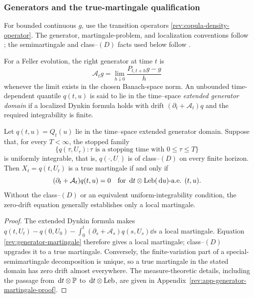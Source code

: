 \subsubsection{Generators and the true-martingale qualification}

For bounded continuous $g$, use the transition operators
\eqref{rev:copula-density-operator}.  The generator, martingale-problem, and
localization conventions follow \citet[Chapter~4]{EthierKurtz1986}; the
semimartingale and class--$(D)$ facts used below follow
\citet[Chapters~I--III]{Protter2005}.

\begin{definition}
\label{rev:def-generator}
For a Feller evolution, the right generator at time $t$ is
\begin{equation}
\mathcal A_tg=\lim_{h\downarrow0}
\frac{P_{t,t+h}g-g}{h}
\label{rev:right-generator}
\end{equation}
whenever the limit exists in the chosen Banach-space norm.  An unbounded
time-dependent quantile $q(t,u)$ is said to lie in the time--space
\emph{extended generator domain} if a localized Dynkin formula holds with
drift $(\partial_t+\mathcal A_t)q$ and the required integrability is finite.
\end{definition}

\begin{theorem}
\label{rev:thm-generator-martingale}
Let $q(t,u)=Q_t(u)$ lie in the time--space extended generator domain.  Suppose
that, for every $T<\infty$, the stopped family
\[
\{q(\tau,U_\tau):\tau\text{ is a stopping time with }0\le\tau\le T\}
\]
is uniformly integrable, that is, $q(\cdot,U_\cdot)$ is of class--$(D)$ on
every finite horizon.  Then
$X_t=q(t,U_t)$ is a true martingale if and only if
\begin{equation}
(\partial_t+\mathcal A_t)q(t,u)=0
\quad\text{for }\,\mathrm d t\otimes\operatorname{Leb}(\,\mathrm d u)\text{-a.e. }(t,u).
\label{rev:generator-martingale}
\end{equation}
Without the class--$(D)$ or an equivalent uniform-integrability condition, the
zero-drift equation generally establishes only a local martingale.
\end{theorem}

\begin{proof}
The extended Dynkin formula makes
$q(t,U_t)-q(0,U_0)-\int_0^t(\partial_s+\mathcal A_s)q(s,U_s)\dd s$
a local martingale.  Equation \eqref{rev:generator-martingale} therefore gives
a local martingale; class--$(D)$ upgrades it to a true martingale.  Conversely,
the finite-variation part of a special-semimartingale decomposition is unique,
so a true martingale in the stated domain has zero drift almost everywhere.
The measure-theoretic details, including the passage from
$\,\mathrm d t\otimes\mathbb P$ to $\,\mathrm d t\otimes\operatorname{Leb}$, are given in
Appendix~\ref{rev:app-generator-martingale-proof}.
\end{proof}

